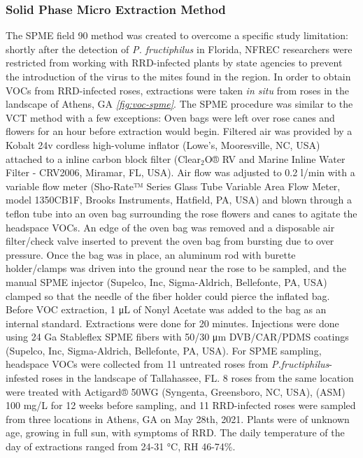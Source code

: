 \documentclass[12pt,final,CPage]{ufthesis}
\begin{document}
{  \hypertarget{mm-spme}{%
  \subsubsection{Solid Phase Micro Extraction Method}\label{mm-spme}}

  The SPME field 90 method was created to overcome a specific study limitation: shortly after the detection of \emph{P. fructiphilus} in Florida, NFREC researchers were restricted from working with RRD-infected plants by state agencies to prevent the introduction of the virus to the mites found in the region. In order to obtain VOCs from RRD-infected roses, extractions were taken \emph{in situ} from roses in the landscape of Athens, GA \emph{\ref{fig:voc-spme}}. The SPME procedure was similar to the VCT method with a few exceptions: Oven bags were left over rose canes and flowers for an hour before extraction would begin. Filtered air was provided by a Kobalt 24v cordless high-volume inflator (Lowe's, Mooresville, NC, USA) attached to a inline carbon block filter (Clear\(_2\)O® RV and Marine Inline Water Filter - CRV2006, Miramar, FL, USA). Air flow was adjusted to 0.2 \si{\litre}/min with a variable flow meter (Sho-Rate™ Series Glass Tube Variable Area Flow Meter, model 1350CB1F, Brooks Instruments, Hatfield, PA, USA) and blown through a teflon tube into an oven bag surrounding the rose flowers and canes to agitate the headspace VOCs. An edge of the oven bag was removed and a disposable air filter/check valve inserted to prevent the oven bag from bursting due to over pressure. Once the bag was in place, an aluminum rod with burette holder/clamps was driven into the ground near the rose to be sampled, and the manual SPME injector (Supelco, Inc, Sigma-Aldrich, Bellefonte, PA, USA) clamped so that the needle of the fiber holder could pierce the inflated bag. Before VOC extraction, 1 \si{\micro\liter} of Nonyl Acetate was added to the bag as an internal standard. Extractions were done for 20 minutes. Injections were done using 24 Ga Stableflex SPME fibers with 50/30 \si{\micro\meter} DVB/CAR/PDMS coatings (Supelco, Inc, Sigma-Aldrich, Bellefonte, PA, USA). For SPME sampling, headspace VOCs were collected from 11 untreated roses from \emph{P.fructiphilus}-infested roses in the landscape of Tallahassee, FL. 8 roses from the same location were treated with Actigard® 50WG (Syngenta, Greensboro, NC, USA), (ASM) 100 \si{\milli\gram}/\si{\liter} for 12 weeks before sampling, and 11 RRD-infected roses were sampled from three locations in Athens, GA on May 28th, 2021. Plants were of unknown age, growing in full sun, with symptoms of RRD. The daily temperature of the day of extractions ranged from 24-31 °C, RH 46-74\%.

}
\end{document}
